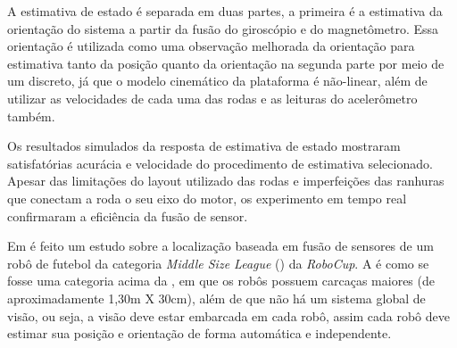 \documentclass[acronym, symbols, table]{fei}
\begin{document}
	A estimativa de estado é separada em duas partes, a primeira é a estimativa da orientação do sistema a partir da fusão do giroscópio e do magnetômetro. Essa orientação é utilizada como uma observação melhorada da orientação para estimativa tanto da posição quanto da orientação na segunda parte por meio de um  discreto, já que o modelo cinemático da plataforma é não-linear, além de utilizar as velocidades de cada uma das rodas e as leituras do acelerômetro também.
	
	Os resultados simulados da resposta de estimativa de estado mostraram satisfatórias acurácia e velocidade do procedimento de estimativa selecionado. Apesar das limitações do layout utilizado das rodas e imperfeições das ranhuras que conectam a roda o seu eixo do motor, os experimento em tempo real confirmaram a eficiência da fusão de sensor.
	
%	
	
	Em \textcite{ismail2022soccer} é feito um estudo sobre a localização baseada em fusão de sensores de um robô de futebol da categoria \textit{Middle Size League} () da \textit{RoboCup}. A  é como se fosse uma categoria acima da , em que os robôs possuem carcaças maiores (de aproximadamente 1,30m X 30cm), além de que não há um sistema global de visão, ou seja, a visão deve estar embarcada em cada robô, assim cada robô deve estimar sua posição e orientação de forma automática e independente.
	
\end{document}
